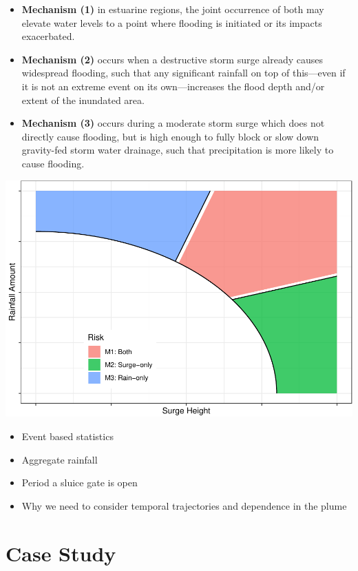 \documentclass[]{article}
\providecommand{\tightlist}{%
  \setlength{\itemsep}{0pt}\setlength{\parskip}{0pt}}
\begin{document}
\begin{itemize}
\tightlist
\item
  \textbf{Mechanism (1)} in estuarine regions, the joint occurrence of
  both may elevate water levels to a point where flooding is initiated
  or its impacts exacerbated.\\
\item
  \textbf{Mechanism (2)} occurs when a destructive storm surge already
  causes widespread flooding, such that any significant rainfall on top
  of this---even if it is not an extreme event on its own---increases
  the flood depth and/or extent of the inundated area.\\
\item
  \textbf{Mechanism (3)} occurs during a moderate storm surge which does
  not directly cause flooding, but is high enough to fully block or slow
  down gravity-fed storm water drainage, such that precipitation is more
  likely to cause flooding.
\end{itemize}

\includegraphics{draft_files/figure-latex/region a-1.pdf}

\begin{itemize}
\item
  Event based statistics
\item
  Aggregate rainfall
\item
  Period a sluice gate is open
\item
  Why we need to consider temporal trajectories and dependence in the
  plume
\end{itemize}

\section{Case Study}\label{case-study}
\end{document}
